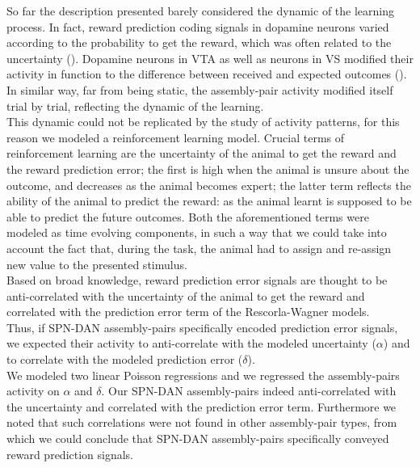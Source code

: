 So far the description presented barely considered the dynamic of the learning process. In fact, reward prediction coding signals in dopamine neurons varied according to the probability to get the reward, which was often related to the uncertainty (\cite{Schultz1992}). Dopamine neurons in VTA as well as neurons in VS modified their activity in function to the difference between received and expected outcomes (\cite{Fiorillo}). In similar way, far from being static, the assembly-pair activity modified itself trial by trial, reflecting the dynamic of the learning.\\This dynamic could not be replicated by the study of activity patterns, for this reason we modeled a reinforcement learning model. Crucial terms of reinforcement learning are the uncertainty of the animal to get the reward and the reward prediction error; the first is high when the animal is unsure about the outcome, and decreases as the animal becomes expert; the latter term reflects the ability of the animal to predict the reward: as the animal learnt is supposed to be able to predict the future outcomes. Both the aforementioned terms were modeled as time evolving components, in such a way that we could take into account the fact that, during the task, the animal had to assign and re-assign new value to the presented stimulus.\\Based on broad knowledge, reward prediction error signals are thought to be anti-correlated with the uncertainty of the animal to get the reward and correlated with the prediction error term of the Rescorla-Wagner models.\\Thus, if SPN-DAN assembly-pairs specifically encoded prediction error signals, we expected their activity to anti-correlate with the modeled uncertainty ($\alpha$) and to correlate with the modeled prediction error ($\delta$).\\We modeled two linear Poisson regressions and we regressed the assembly-pairs activity on $\alpha$ and $\delta$. Our SPN-DAN assembly-pairs indeed anti-correlated with the uncertainty and correlated with the prediction error term. Furthermore we noted that such correlations were not found in other assembly-pair types, from which we could conclude that SPN-DAN assembly-pairs specifically conveyed reward prediction signals.  